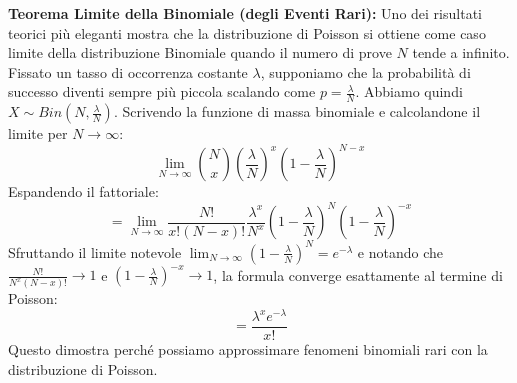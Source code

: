 \documentclass[12pt, a4paper]{article}
\begin{document}
\textbf{Teorema Limite della Binomiale (degli Eventi Rari):}
Uno dei risultati teorici più eleganti mostra che la distribuzione di Poisson si ottiene come caso limite della distribuzione Binomiale quando il numero di prove $N$ tende a infinito.
Fissato un tasso di occorrenza costante $\lambda$, supponiamo che la probabilità di successo diventi sempre più piccola scalando come $p = \frac{\lambda}{N}$. Abbiamo quindi $X \sim Bin(N, \frac{\lambda}{N})$. 
Scrivendo la funzione di massa binomiale e calcolandone il limite per $N \to \infty$:
$$ \lim_{N \to \infty} \binom{N}{x} \left(\frac{\lambda}{N}\right)^x \left(1-\frac{\lambda}{N}\right)^{N-x} $$
Espandendo il fattoriale:
$$ = \lim_{N \to \infty} \frac{N!}{x!(N-x)!} \frac{\lambda^x}{N^x} \left(1-\frac{\lambda}{N}\right)^N \left(1-\frac{\lambda}{N}\right)^{-x} $$
Sfruttando il limite notevole $\lim_{N \to \infty} \left(1-\frac{\lambda}{N}\right)^N = e^{-\lambda}$ e notando che $\frac{N!}{N^x (N-x)!} \to 1$ e $(1-\frac{\lambda}{N})^{-x} \to 1$, la formula converge esattamente al termine di Poisson:
$$ = \frac{\lambda^x e^{-\lambda}}{x!} $$
Questo dimostra perché possiamo approssimare fenomeni binomiali rari con la distribuzione di Poisson.
\end{document}
